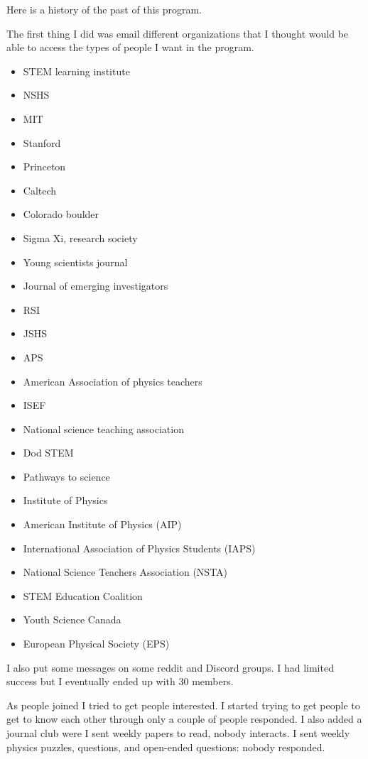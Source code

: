 \par Here is a history of the past of this program.
\par The first thing I did was email different organizations that I thought would be able to access the types of people I want in the program. 
\begin{itemize}
    \item STEM learning institute 
    \item NSHS
    \item MIT
    \item Stanford
    \item Princeton 
    \item Caltech
    \item Colorado boulder 
    \item Sigma Xi, research society
    \item Young scientists journal
    \item Journal of emerging investigators
    \item RSI
    \item JSHS
    \item APS
    \item American Association of physics teachers
    \item ISEF
    \item National science teaching association 
    \item Dod STEM
    \item Pathways to science
    \item Institute of Physics
    \item American Institute of Physics (AIP)
    \item International Association of Physics Students (IAPS)
    \item National Science Teachers Association (NSTA)
    \item STEM Education Coalition
    \item Youth Science Canada
    \item European Physical Society (EPS)
\end{itemize}
\par I also put some messages on some reddit and Discord groups. I had limited success but I eventually ended up with 30 members.
\par As people joined I tried to get people interested. I started trying to get people to get to know each other through only a couple of people responded. I also added a journal club were I sent weekly papers to read, nobody interacts. I sent weekly physics puzzles, questions, and open-ended questions: nobody responded.
